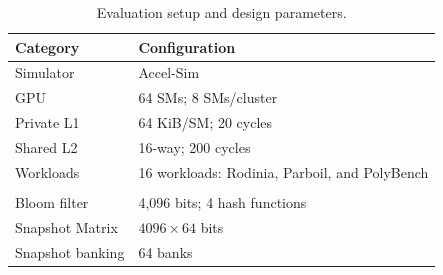 \documentclass[10pt]{article}
\begin{document}
\begin{table}[ht]
\centering
\caption{Evaluation setup and design parameters.}
\label{tab:c2p-evaluation-setup}
\small
\begin{tabular}{@{}ll@{}}
\toprule
\textbf{Category} & \textbf{Configuration} \\
\midrule
Simulator & Accel-Sim \\
GPU & 64 SMs; 8 SMs/cluster \\
Private L1 & 64 KiB/SM; 20 cycles \\
Shared L2 & 16-way; 200 cycles \\
Workloads & 16 workloads: Rodinia, Parboil, and PolyBench \\
\addlinespace
\multicolumn{2}{@{}l}{\textit{Design parameters}} \\
Bloom filter & 4,096 bits; 4 hash functions \\
Snapshot Matrix & $4096 \times 64$ bits \\
Snapshot banking & 64 banks \\
\bottomrule
\end{tabular}
\end{table}
\end{document}
